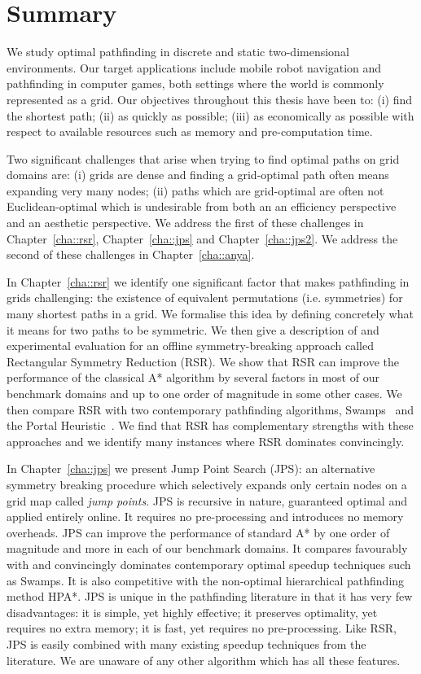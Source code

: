 \section{Summary}
\label{cha::conclusion::summary}
We study optimal pathfinding in discrete and static two-dimensional
environments. Our target applications include mobile robot navigation and
pathfinding in computer games, both settings where the world is commonly
represented as a grid. Our objectives throughout this thesis have been to: (i)
find the shortest path; (ii) as quickly as possible; (iii) as economically as
possible with respect to available resources such as memory and
pre-computation time.

Two significant challenges that arise when trying to find optimal
paths on grid domains are: (i) grids are dense and finding a grid-optimal path often
means expanding very many nodes; (ii) paths which are grid-optimal are often
not Euclidean-optimal which is undesirable from both an an efficiency
perspective and an aesthetic perspective. We address the first of these
challenges in Chapter~\ref{cha::rsr}, Chapter~\ref{cha::jps} and
Chapter~\ref{cha::jps2}.  We address the second of these challenges in
Chapter~\ref{cha::anya}.

In Chapter~\ref{cha::rsr} we identify one significant factor that makes
pathfinding in grids challenging: the existence of equivalent permutations 
(i.e. symmetries) for many shortest paths in a grid. We formalise this idea by defining concretely
what it means for two paths to be symmetric. We then give a description of and
experimental evaluation for an offline symmetry-breaking approach called
Rectangular Symmetry Reduction (RSR). We show that RSR can improve the
performance of the classical A{*} algorithm by several factors in most of our
benchmark domains and up to one order of magnitude in some other cases.
We then compare RSR with two contemporary pathfinding algorithms, 
Swamps~\citep{pochter10} and the Portal Heuristic~\citep{goldenberg10}.
We find that RSR has complementary strengths with these approaches and we
identify many instances where RSR dominates convincingly.

In Chapter~\ref{cha::jps} we present Jump Point Search (JPS): an alternative
symmetry breaking procedure which selectively expands only certain nodes on
a grid map called \emph{jump points}.  JPS is recursive in nature,
guaranteed optimal and applied entirely online. It requires no pre-processing
and introduces no memory overheads. JPS can improve the performance of standard
A{*} by one order of magnitude and more in each of our benchmark domains. It
compares favourably with and convincingly dominates contemporary optimal
speedup techniques such as Swamps. It is also competitive with the non-optimal
hierarchical pathfinding method HPA{*}.  JPS is unique in the pathfinding
literature in that it has very few disadvantages: it is simple, yet highly
effective; it preserves optimality, yet requires no extra memory;  it is
fast, yet requires no pre-processing. Like RSR, JPS is easily combined with
many existing speedup techniques from the literature. We are unaware of any 
other algorithm which has all these features.

